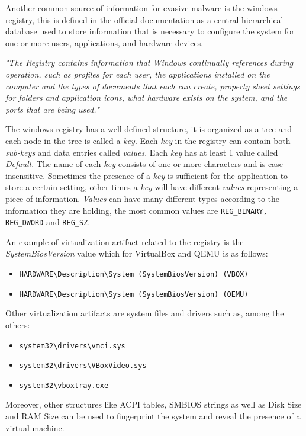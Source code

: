 Another common source of information for evasive malware is the windows registry, this is defined in the official documentation as a central hierarchical database used to store information that is necessary to configure the system for one or more users, applications, and hardware devices.

\textit{"The Registry contains information that Windows continually references during operation, such as profiles for each user, the applications installed on the computer and the types of documents that each can create, property sheet settings for folders and application icons, what hardware exists on the system, and the ports that are being used."}\cite{windocs}

The windows registry has a well-defined structure, it is organized as a tree and each node in the tree is called a \textit{key}. Each \textit{key} in the registry can contain both \textit{sub-keys} and data entries called \textit{values}. Each \textit{key} has at least 1 value called \textit{Default}. The name of each \textit{key} consists of one or more characters and is case insensitive. Sometimes the presence of a \textit{key} is sufficient for the application to store a certain setting, other times a \textit{key} will have different \textit{values} representing a piece of information. \textit{Values} can have many different types according to the information they are holding, the most common values are \lstinline{REG_BINARY, REG_DWORD} and \lstinline{REG_SZ}. 

An example of virtualization artifact related to the registry is the \textit{SystemBiosVersion} value which for VirtualBox and QEMU is as follows:
\begin{itemize}
    \item \lstinline{HARDWARE\Description\System (SystemBiosVersion) (VBOX)}
    \item \lstinline{HARDWARE\Description\System (SystemBiosVersion) (QEMU)} 
\end{itemize}

Other virtualization artifacts are system files and drivers such as, among the others:
\begin{itemize}
    \item \lstinline{system32\drivers\vmci.sys}
    \item \lstinline{system32\drivers\VBoxVideo.sys}
    \item \lstinline{system32\vboxtray.exe}
\end{itemize}

Moreover, other structures like ACPI tables, SMBIOS strings as well as Disk Size and RAM Size can be used to fingerprint the system and reveal the presence of a virtual machine. 


